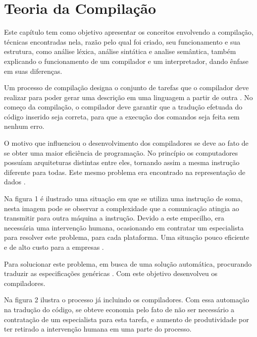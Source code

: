 \documentclass[12pt,oneside,a4paper,chapter=TITLE,section=TITLE,sumario=tradicional]{abntex2}
\begin{document}
\chapter{Teoria da Compilação}
\label{cap:teoria-da-compilação}

Este capítulo tem como objetivo apresentar os conceitos envolvendo a compilação, técnicas encontradas nela, razão pelo qual foi criado, seu funcionamento e sua estrutura, como análise léxica, análise sintática e analise semântica, também explicando o funcionamento de um compilador e um interpretador, dando ênfase em suas diferenças.

Um processo de compilação designa o conjunto de tarefas que o compilador deve realizar para poder gerar uma descrição em uma linguagem a partir de outra \cite{pedro2018}. No começo da compilação, o compilador deve garantir que a tradução efetuada do código inserido seja correta, para que a execução dos comandos seja feita sem nenhum erro.

O motivo que influenciou o desenvolvimento dos compiladores se deve ao fato de se obter uma maior eficiência de programação. No princípio os computadores possuíam arquiteturas distintas entre eles, tornando assim a mesma instrução diferente para todas. Este mesmo problema era encontrado na representação de dados \cite{ricarte2008}.

Na figura 1 é ilustrado uma situação em que se utiliza uma instrução de soma, nesta imagem pode se observar a complexidade que a comunicação atingia ao transmitir para outra máquina a instrução. Devido a este empecilho, era necessária uma intervenção humana, ocasionando em contratar um especialista para resolver este problema, para cada plataforma. Uma situação pouco eficiente e de alto custo para a empresas  \cite{ricarte2008}.

\begin{figure}[htb]
\end{figure}

Para solucionar este problema, em busca de uma solução automática, procurando traduzir as especificações genéricas  \cite{ricarte2008}. Com este objetivo desenvolveu os compiladores.

Na figura 2 ilustra o processo já incluindo os compiladores. Com essa automação na tradução do código, se obteve economia pelo fato de não ser necessário a contratação de um especialista para esta tarefa, e aumento de produtividade por ter retirado a intervenção humana em uma parte do processo. 
\end{document}
